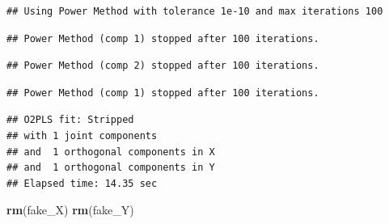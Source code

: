 \documentclass[]{article}
\newenvironment{Shaded}{\begin{snugshade}}{\end{snugshade}}
\newcommand{\KeywordTok}[1]{\textcolor[rgb]{0.13,0.29,0.53}{\textbf{{#1}}}}
\newcommand{\NormalTok}[1]{{#1}}
\begin{document}
\begin{verbatim}
## Using Power Method with tolerance 1e-10 and max iterations 100
\end{verbatim}

\begin{verbatim}
## Power Method (comp 1) stopped after 100 iterations.
\end{verbatim}

\begin{verbatim}
## Power Method (comp 2) stopped after 100 iterations.
\end{verbatim}

\begin{verbatim}
## Power Method (comp 1) stopped after 100 iterations.
\end{verbatim}

\begin{verbatim}
## O2PLS fit: Stripped 
## with 1 joint components  
## and  1 orthogonal components in X 
## and  1 orthogonal components in Y 
## Elapsed time: 14.35 sec
\end{verbatim}

\begin{Shaded}
\begin{Highlighting}[]
\KeywordTok{rm}\NormalTok{(fake_X)}
\KeywordTok{rm}\NormalTok{(fake_Y)}
\end{Highlighting}
\end{Shaded}
\end{document}
